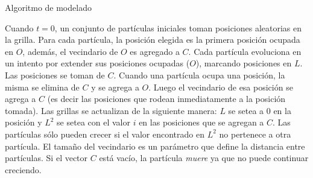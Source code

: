 \begin{algorithm}[h!]
\caption{Algoritmo de modelado}
\begin{algorithmic}


    \EndFor
\EndFor

        \EndIf
                 
                 
            \EndIf
        \EndFor
    \EndFor
\EndFor
\end{algorithmic}
\end{algorithm}

Cuando $t = 0$, un conjunto de part\'iculas iniciales toman posiciones aleatorias en la grilla. Para cada partícula, la posici\'on elegida es la primera posici\'on ocupada en $O$, adem\'as, el vecindario de $O$ es agregado a $C$. Cada part\'icula evoluciona en un intento por extender sus posiciones ocupadas ($O$), marcando posiciones en $L$. Las posiciones se toman de $C$. Cuando una part\'icula ocupa una posici\'on, la misma se elimina de $C$ y se agrega a $O$. Luego el vecindario de esa posici\'on se agrega a $C$ (es decir las posiciones que rodean inmediatamente a la posici\'on tomada). Las grillas se actualizan de la siguiente manera: $L$ se setea a $0$ en la posici\'on y $L^{2}$ se setea con el valor $i$ en las posiciones que se agregan a $C$. Las part\'iculas s\'olo pueden crecer si el valor encontrado en $L^{2}$ no pertenece a otra part\'icula. El tama\~no del vecindario es un par\'ametro que define la distancia entre part\'iculas. Si el vector $C$ est\'a vac\'io, la part\'icula {\em muere} ya que no puede continuar creciendo.


